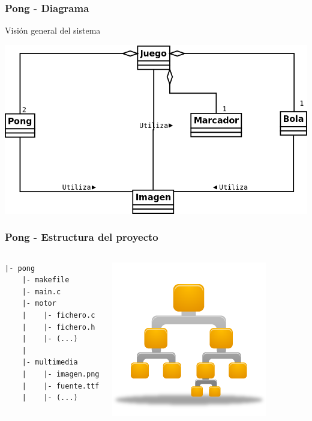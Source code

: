 \begin{frame}
	\frametitle{Pong - Diagrama}
	
    \begin{center}
        Visión general del sistema
    \end{center}
	
    \begin{center}
		\includegraphics[scale=0.25]{img/modulos.png}
	\end{center}	

\end{frame}

\begin{frame}[fragile]
	\frametitle{Pong - Estructura del proyecto}
    
    \begin{columns}[c]
	\column{175pt}

\begin{verbatim}
|- pong
    |- makefile
    |- main.c
    |- motor
    |    |- fichero.c
    |    |- fichero.h
    |    |- (...)
    |
    |- multimedia
    |    |- imagen.png
    |    |- fuente.ttf
    |    |- (...)
\end{verbatim}
	
	\column{125pt}
	\begin{center}
		\includegraphics[scale=0.4]{img/Binary-tree-256.png}
	\end{center}	
	
    \end{columns}

\end{frame}


